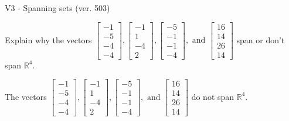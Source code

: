 \begin{exercise}
  \begin{exerciseTitle}V3 - Spanning sets (ver. 503)\end{exerciseTitle}
  \begin{exerciseStatement}
    Explain why the vectors \(\left[\begin{array}{r}
-1 \\
-5 \\
-4 \\
-4
\end{array}\right] , \left[\begin{array}{r}
-1 \\
1 \\
-4 \\
2
\end{array}\right] , \left[\begin{array}{r}
-5 \\
-1 \\
-1 \\
-4
\end{array}\right] , \text{ and } \left[\begin{array}{r}
16 \\
14 \\
26 \\
14
\end{array}\right]\) span or don't span \(\mathbb{R}^4\). 
	


  \end{exerciseStatement}
  \begin{exerciseAnswer}
   The vectors \(\left[\begin{array}{r}
-1 \\
-5 \\
-4 \\
-4
\end{array}\right] , \left[\begin{array}{r}
-1 \\
1 \\
-4 \\
2
\end{array}\right] , \left[\begin{array}{r}
-5 \\
-1 \\
-1 \\
-4
\end{array}\right] , \text{ and } \left[\begin{array}{r}
16 \\
14 \\
26 \\
14
\end{array}\right]\) 
  	 do not  
	span \(\mathbb{R}^4\).
  


  \end{exerciseAnswer}
\end{exercise}
